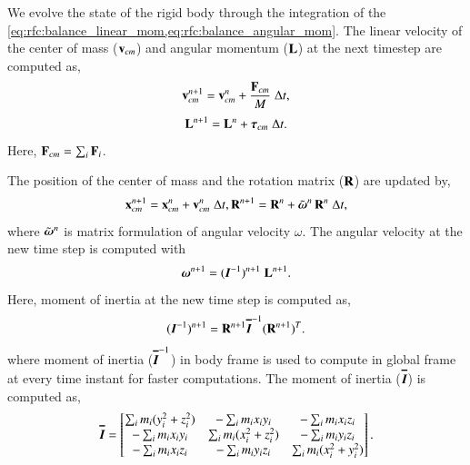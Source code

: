 We evolve the state of the rigid body through the integration of the
\cref{eq:rfc:balance_linear_mom,eq:rfc:balance_angular_mom}. The linear velocity of the
center of mass ($\mathbf{v}_{cm}$) and angular momentum ($\mathbf{L}$) at the next
timestep are computed as,
\begin{equation}
  \label{eq:rfc:lin_vel_cm_update}
  \mathbf{v}_{cm}^{n+1} = \mathbf{v}_{cm}^{n} + \frac{\mathbf{F}_{cm}}{M} \; \Delta t,
\end{equation}
\begin{equation}
  \label{eq:rfc:ang_mom_update}
  \mathbf{L}^{n+1} = \mathbf{L}^{n} + \boldsymbol{\tau}_{cm} \; \Delta t.
\end{equation}
Here, $\mathbf{F}_{cm} = \sum_i \mathbf{F}_i$.

The position of the center of mass and the rotation matrix ($\mathbf{R}$) are updated
by,
\begin{equation}
  \label{eq:rfc:lin_pos_cm_update}
  \mathbf{x}_{cm}^{n+1} = \mathbf{x}_{cm}^{n} + \mathbf{v}_{cm}^{n} \; \Delta t,\\
  \mathbf{R}^{n+1} = \mathbf{R}^{n} + \tilde{\boldsymbol{\omega}}^{n} \, \mathbf{R}^{n} \; \Delta t,
\end{equation}
where $\tilde{\boldsymbol{\omega}}^{n}$ is matrix formulation of angular velocity
$\omega$. The angular velocity at the new time step is computed with
\begin{equation}
  \label{eq:rfc:ang_velocity_update}
  \boldsymbol{\omega}^{n+1} = (\textit{\ensuremath{\boldsymbol{I}}}^{-1})^{n+1} \; \mathbf{L}^{n+1}.
\end{equation}
Here, moment of inertia at the new time step is computed as,
\begin{equation}
  \label{eq:rfc:moi_update}
  (\textit{\ensuremath{\boldsymbol{I}}}^{-1})^{n+1} = \mathbf{R}^{n+1} \textit{\ensuremath{\boldsymbol{\overline{I}}}}^{-1} (\mathbf{R}^{n+1})^T.
\end{equation}
where moment of inertia ($\textit{\ensuremath{\boldsymbol{\overline{I}}}}^{-1}$) in body frame is
used to compute in global frame at every time instant for faster computations.
The moment of inertia ($\textit{\ensuremath{\boldsymbol{\overline{I}}}}$) is computed as,
\begin{equation*}
\textit{\ensuremath{\boldsymbol{\overline{I}}}} =
\begin{bmatrix}
\sum_i m_i (y_i^2 + z_i^2) & -\sum_i m_i x_iy_i & -\sum_i m_i x_iz_i\\
-\sum_i m_i x_iy_i & \sum_i m_i (x_i^2 + z_i^2) &  -\sum_i m_i y_iz_i\\
-\sum_i m_i  x_iz_i & -\sum_i m_i y_iz_i & \sum_i m_i (x_i^2 + y_i^2)
\end{bmatrix}.
\end{equation*}

